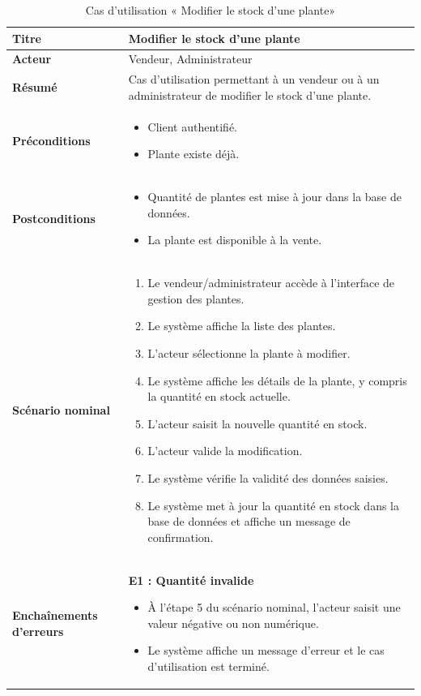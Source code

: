 \begin{table}[H]
\centering
\renewcommand{\arraystretch}{1.4}
\begin{tabular}{|p{4cm}|p{10cm}|}
\hline
\textbf{Titre} & Modifier le stock d'une plante \\
\hline
\textbf{Acteur} & Vendeur, Administrateur \\
\hline
\textbf{Résumé} & Cas d'utilisation permettant à un vendeur ou à un administrateur de modifier le stock d'une plante. \\
\hline
\textbf{Préconditions} &
\vspace{-12pt}
\begin{itemize}
    \item Client authentifié.
    \item Plante existe déjà.
\end{itemize} \\
\hline
\textbf{Postconditions} &
\vspace{-12pt}
\begin{itemize}
    \item Quantité de plantes est mise à jour dans la base de données.
    \item La plante est disponible à la vente.
\end{itemize} \\
\hline
\textbf{Scénario nominal} &
\vspace{-12pt}
\begin{enumerate}
    \item Le vendeur/administrateur accède à l'interface de gestion des plantes.
    \item Le système affiche la liste des plantes.
    \item L'acteur sélectionne la plante à modifier.
    \item Le système affiche les détails de la plante, y compris la quantité en stock actuelle.
    \item L'acteur saisit la nouvelle quantité en stock.
    \item L'acteur valide la modification.
    \item Le système vérifie la validité des données saisies.
    \item Le système met à jour la quantité en stock dans la base de données et affiche un message de confirmation.
\end{enumerate} \\
\hline
\textbf{Enchaînements d'erreurs} &
\vspace{-12pt}
\textbf{E1 : Quantité invalide}
\begin{itemize}
    \item À l'étape 5 du scénario nominal, l'acteur saisit une valeur négative ou non numérique.
    \item Le système affiche un message d'erreur et le cas d'utilisation est terminé.
\end{itemize} \\
\hline
\end{tabular}
\caption{Cas d'utilisation « Modifier le stock d'une plante»}
\label{tableau1}
\end{table}

